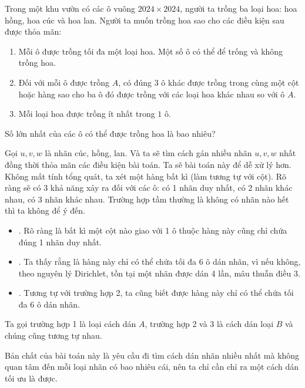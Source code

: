 \documentclass[11pt]{scrartcl}
\begin{document}
\begin{itemize}[label=, leftmargin=0em, itemsep=0.5em]
\begin{sol}
    \end{sol}
    \begin{bt} Trong một khu vườn có các ô vuông $2024\times 2024$, người ta trồng ba loại hoa: hoa hồng, hoa cúc và hoa lan. Người ta muốn trồng hoa sao cho các điều kiện sau được thỏa mãn:
        \begin{enumerate}
            \item Mỗi ô được trồng tối đa một loại hoa. Một số ô có thể để trống và không trồng hoa.
            \item Đối với mỗi ô được trồng $A$, có đúng $3$ ô khác được trồng trong cùng một cột hoặc hàng sao cho ba ô đó được trồng với các loại hoa khác nhau so với ô $A$.
            \item Mỗi loại hoa được trồng ít nhất trong $1$ ô.
        \end{enumerate}
        Số lớn nhất của các ô có thể được trồng hoa là bao nhiêu?
    \end{bt}
    \begin{sol}
        Gọi $u,v,w$ là nhãn cúc, hồng, lan. Và ta sẽ tìm cách gán nhiều nhãn $u,v,w$ nhất đồng thời thỏa mãn các điều kiện bài toán.
        Ta sẽ  bài toán này để dễ xử lý hơn. Không mất tính tổng quát, ta xét một hàng bất kì (làm tương tự với cột). Rõ ràng sẽ có 3 khả năng xảy ra đối với các ô: có 1 nhãn duy nhất, có 2 nhãn khác nhau, có 3 nhãn khác nhau. Trường hợp tầm thường là không có nhãn nào hết thì ta không để ý đến.
        \begin{itemize}
            \item {}. Rõ ràng là bất kì một cột nào giao với 1 ô thuộc hàng này cũng chỉ chứa đúng 1 nhãn duy nhất.
            \item {}. Ta thấy rằng là hàng này chỉ có thể chứa tối đa 6 ô dán nhãn, vì nếu không, theo nguyên lý Dirichlet, tồn tại một nhãn được dán 4 lần, mâu thuẫn điều 3.
            \item {}. Tương tự với trường hợp 2, ta cũng biết được hàng này chỉ có thể chứa tối đa 6 ô dán nhãn.
        \end{itemize}
        Ta gọi trường hợp 1 là loại cách dán $A$, trường hợp 2 và 3 là cách dán loại $B$ và chúng cũng tương tự nhau.


        Bản chất của bài toán này là yêu cầu đi tìm cách dán nhãn nhiều nhất mà không quan tâm đến mỗi loại nhãn có bao nhiêu cái, nên ta chỉ cần chỉ ra một cách dán tối ưu là được.



\end{sol}
\end{itemize}
\end{document}
